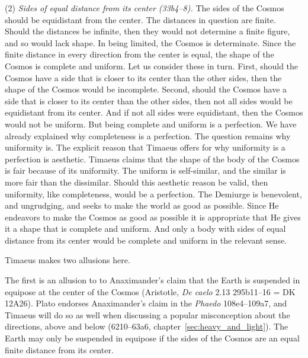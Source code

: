 (2) \emph{Sides of equal distance from its center (33b4--8).} The sides of the Cosmos should be equidistant from the center. The distances in question are finite. Should the distances be infinite, then they would not determine a finite figure, and so would lack shape. In being limited, the Cosmos is determinate. Since the finite distance in every direction from the center is equal, the shape of the Cosmos is complete and uniform. Let us consider these in turn. First, should the Cosmos have a side that is closer to its center than the other sides, then the shape of the Cosmos would be incomplete. Second, should the Cosmos have a side that is closer to its center than the other sides, then not all sides would be equidistant from its center. And if not all sides were equidistant, then the Cosmos would not be uniform. But being complete and uniform is a perfection. We have already explained why completeness is a perfection. The question remains why uniformity is. The explicit reason that Timaeus offers for why uniformity is a perfection is aesthetic. Timaeus claims that the shape of the body of the Cosmos is fair because of its uniformity. The uniform is self-similar, and the similar is more fair than the dissimilar. Should this aesthetic reason be valid, then uniformity, like completeness, would be a perfection. The Demiurge is benevolent, and ungrudging, and seeks to make the world as good as possible. Since He endeavors to make the Cosmos as good as possible it is appropriate that He gives it a shape that is complete and uniform. And only a body with sides of equal distance from its center would be complete and uniform in the relevant sense.

Timaeus makes two allusions here. 

The first is an allusion to to Anaximander's claim that the Earth is suspended in equipose at the center of the Cosmos (Aristotle, \emph{De caelo} 2.13 295b11–16 = DK 12A26). Plato endorses Anaximander’s claim in the \emph{Phaedo} 108e4–109a7, and Timaeus will do so as well when discussing a popular misconception about the directions, above and below (6210–63a6, chapter~\ref{sec:heavy_and_light}). The Earth may only be suspended in equipose if the sides of the Cosmos are an equal finite distance from its center. 

